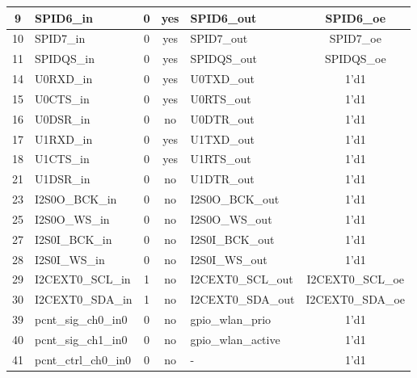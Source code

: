\begin{longtable}[c]{|c|l|c|c|l|c|}
  9  &                SPID6\_in  &  0  &  yes  &              SPID6\_out  &          SPID6\_oe  \\\hline
 10  &                SPID7\_in  &  0  &  yes  &              SPID7\_out  &          SPID7\_oe  \\\hline
 11  &               SPIDQS\_in  &  0  &  yes  &             SPIDQS\_out  &         SPIDQS\_oe  \\\hline
 14  &                U0RXD\_in  &  0  &  yes  &              U0TXD\_out  &               1'd1  \\\hline
 15  &                U0CTS\_in  &  0  &  yes  &              U0RTS\_out  &               1'd1  \\\hline
 16  &                U0DSR\_in  &  0  &   no  &              U0DTR\_out  &               1'd1  \\\hline
 17  &                U1RXD\_in  &  0  &  yes  &              U1TXD\_out  &               1'd1  \\\hline
 18  &                U1CTS\_in  &  0  &  yes  &              U1RTS\_out  &               1'd1  \\\hline
 21  &                U1DSR\_in  &  0  &   no  &              U1DTR\_out  &               1'd1  \\\hline
 23  &           I2S0O\_BCK\_in  &  0  &   no  &         I2S0O\_BCK\_out  &               1'd1  \\\hline
 25  &            I2S0O\_WS\_in  &  0  &   no  &          I2S0O\_WS\_out  &               1'd1  \\\hline
 27  &           I2S0I\_BCK\_in  &  0  &   no  &         I2S0I\_BCK\_out  &               1'd1  \\\hline
 28  &            I2S0I\_WS\_in  &  0  &   no  &          I2S0I\_WS\_out  &               1'd1  \\\hline
 29  &         I2CEXT0\_SCL\_in  &  1  &   no  &       I2CEXT0\_SCL\_out  &   I2CEXT0\_SCL\_oe  \\\hline
 30  &         I2CEXT0\_SDA\_in  &  1  &   no  &       I2CEXT0\_SDA\_out  &   I2CEXT0\_SDA\_oe  \\\hline
 39  &      pcnt\_sig\_ch0\_in0  &  0  &   no  &        gpio\_wlan\_prio  &               1'd1  \\\hline
 40  &      pcnt\_sig\_ch1\_in0  &  0  &   no  &      gpio\_wlan\_active  &               1'd1  \\\hline
 41  &     pcnt\_ctrl\_ch0\_in0  &  0  &   no  &                       -  &               1'd1  \\\hline

\end{longtable}
